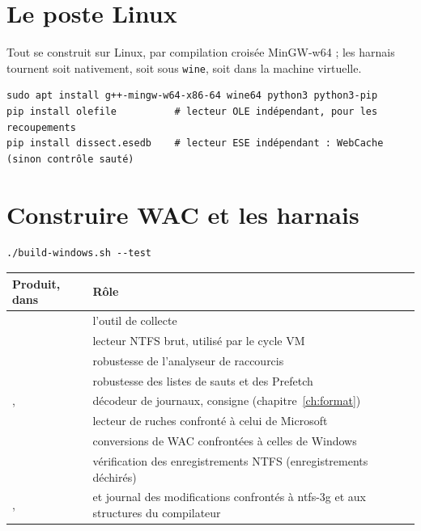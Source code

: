 \documentclass[11pt,a4paper,oneside]{report}
\begin{document}
\section{Le poste Linux}

Tout se construit sur Linux, par compilation croisée MinGW-w64 ; les harnais
tournent soit nativement, soit sous \texttt{wine}, soit dans la machine
virtuelle.

\begin{lstlisting}
sudo apt install g++-mingw-w64-x86-64 wine64 python3 python3-pip
pip install olefile          # lecteur OLE indépendant, pour les recoupements
pip install dissect.esedb    # lecteur ESE indépendant : WebCache (sinon contrôle sauté)
\end{lstlisting}

\section{Construire WAC et les harnais}

\begin{lstlisting}
./build-windows.sh --test
\end{lstlisting}

\begin{longtable}{@{}L{7.4cm}L{7.6cm}@{}}
\toprule
\textbf{Produit, dans } & \textbf{Rôle} \\
\midrule
\endhead
{} & l'outil de collecte \\
 & lecteur NTFS brut, utilisé par le cycle VM \\
 & robustesse de l'analyseur de raccourcis \\
 & robustesse des listes de sauts et des Prefetch \\
,  & décodeur de journaux, consigne (chapitre~\ref{ch:format}) \\
 & lecteur de ruches confronté à celui de Microsoft \\
 & conversions de WAC confrontées à celles de Windows \\
 & vérification des enregistrements NTFS (enregistrements déchirés) \\
,  &  et journal des modifications confrontés à ntfs-3g et aux structures du compilateur \\
\bottomrule
\end{longtable}
\end{document}

